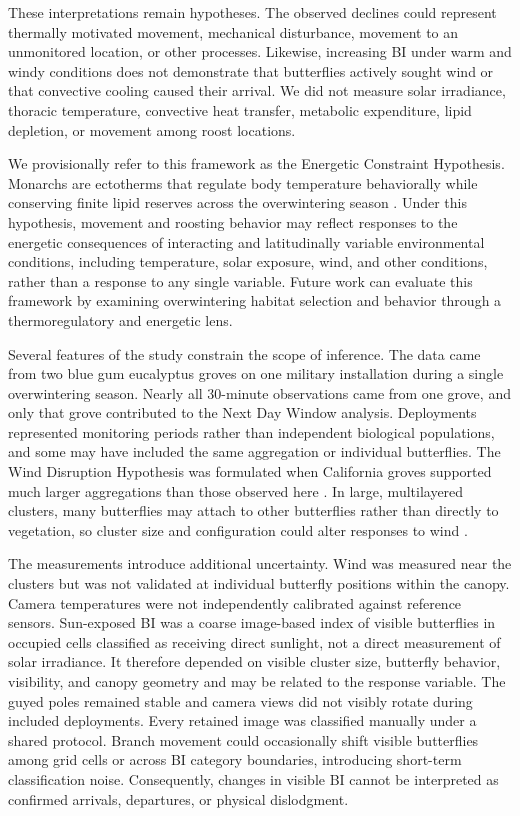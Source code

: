 \documentclass[insects,article,submit,pdftex,moreauthors]{Definitions/mdpi}
\begin{document}
These interpretations remain hypotheses. The observed declines could represent thermally motivated movement, mechanical disturbance, movement to an unmonitored location, or other processes. Likewise, increasing BI under warm and windy conditions does not demonstrate that butterflies actively sought wind or that convective cooling caused their arrival. We did not measure solar irradiance, thoracic temperature, convective heat transfer, metabolic expenditure, lipid depletion, or movement among roost locations.

We provisionally refer to this framework as the Energetic Constraint Hypothesis. Monarchs are ectotherms that regulate body temperature behaviorally while conserving finite lipid reserves across the overwintering season \cite{chaplinEnergyReservesMetabolic1982,mastersMonarchButterflyDanaus1988,kammerThoracicTemperatureShivering1970}. Under this hypothesis, movement and roosting behavior may reflect responses to the energetic consequences of interacting and latitudinally variable environmental conditions, including temperature, solar exposure, wind, and other conditions, rather than a response to any single variable. Future work can evaluate this framework by examining overwintering habitat selection and behavior through a thermoregulatory and energetic lens.

Several features of the study constrain the scope of inference. The data came from two blue gum eucalyptus groves on one military installation during a single overwintering season. Nearly all 30-minute observations came from one grove, and only that grove contributed to the Next Day Window analysis. Deployments represented monitoring periods rather than independent biological populations, and some may have included the same aggregation or individual butterflies. The Wind Disruption Hypothesis was formulated when California groves supported much larger aggregations than those observed here \cite{leongMicroenvironmentalFactorsAssociated1990,leongUseMultivariateAnalyses1991}. In large, multilayered clusters, many butterflies may attach to other butterflies rather than directly to vegetation, so cluster size and configuration could alter responses to wind \cite{browerMonarchButterflyClusters2008}.

The measurements introduce additional uncertainty. Wind was measured near the clusters but was not validated at individual butterfly positions within the canopy. Camera temperatures were not independently calibrated against reference sensors. Sun-exposed BI was a coarse image-based index of visible butterflies in occupied cells classified as receiving direct sunlight, not a direct measurement of solar irradiance. It therefore depended on visible cluster size, butterfly behavior, visibility, and canopy geometry and may be related to the response variable. The guyed poles remained stable and camera views did not visibly rotate during included deployments. Every retained image was classified manually under a shared protocol. Branch movement could occasionally shift visible butterflies among grid cells or across BI category boundaries, introducing short-term classification noise. Consequently, changes in visible BI cannot be interpreted as confirmed arrivals, departures, or physical dislodgment.
\end{document}
